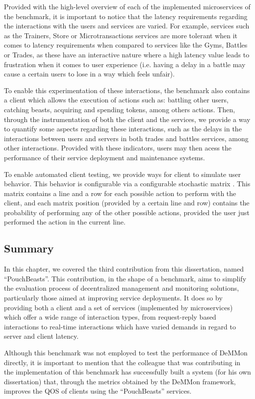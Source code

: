 Provided with the high-level overview of each of the implemented microservices of the benchmark, it is important to notice that the latency requirements regarding the interactions with the users and services are varied. For example, services such as the Trainers, Store or Microtransactions services are more tolerant when it comes to latency requirements when compared to services like the Gyms, Battles or Trades, as these have an interactive nature where a high latency value leads to frustration when it comes to user experience (i.e. having a delay in a battle may cause a certain users to lose in a way which feels unfair).

To enable this experimentation of these interactions, the benchmark also contains a client which allows the execution of actions such as: battling other users, catching beasts, acquiring and spending tokens, among others actions. Then, through the instrumentation of both the client and the services, we provide a way to quantify some aspects regarding these interactions, such as the delays in the interactions between users and servers in both trades and battles services, among other interactions. Provided with these indicators, users may then acess the performance of their service deployment and maintenance systems.

To enable automated client testing, we provide ways for client to simulate user behavior. This behavior is configurable via a configurable stochastic matrix . This matrix contains a line and a row for each possible action to perform with the client, and each matrix position (provided by a certain line and row) contains the probability of performing any of the other possible actions, provided the user just performed the action in the current line. 

\subsection{Summary}

In this chapter, we covered the third contribution from this dissertation, named ``PouchBeasts''. This contribution, in the shape of a benchmark, aims to simplify the evaluation process of decentralized management and monitoring solutions, particularly those aimed at improving service deployments. It does so by providing both a client and a set of services (implemented by microservices) which offer a wide range of interaction types, from request-reply based interactions to real-time interactions which have varied demands in regard to server and client latency.

Although this benchmark was not employed to test the performance of DeMMon directly, it is important to mention that the colleague that was contributing in the implementation of this benchmark has successfully built a system (for his own dissertation) that, through the metrics obtained by the DeMMon framework, improves the QOS of clients using the ``PouchBeasts'' services.